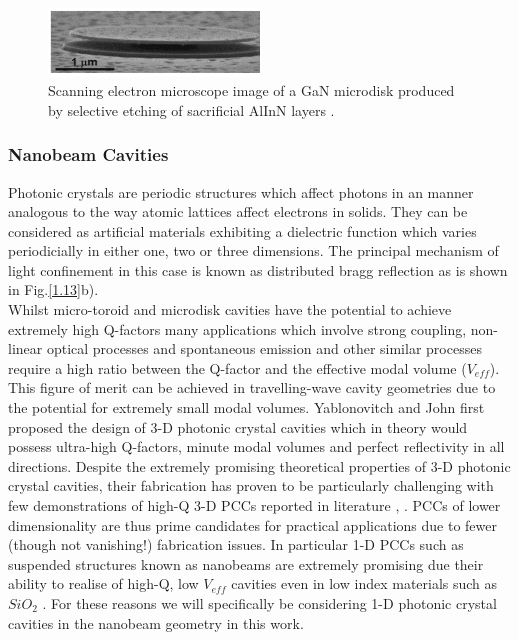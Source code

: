 \begin{figure}[h]
	\centering
	\includegraphics[width=0.5\textwidth]{Figs/Ch1/mdisksem.png}
	\caption {Scanning electron microscope image of a GaN microdisk produced by selective etching of sacrificial AlInN layers \cite{Simeonov2008}.}
	\label{1.15}
\end{figure}
\FloatBarrier 


\subsubsection{Nanobeam Cavities}
\label{nanobeam section}
Photonic crystals are periodic structures which affect photons in an manner analogous to the way atomic lattices affect electrons in solids. They can be considered as artificial materials exhibiting a dielectric function which varies periodicially in either one, two or three dimensions. The principal mechanism of light confinement in this case is known as distributed bragg reflection as is shown in Fig.\ref{1.13}b).\\
Whilst micro-toroid and microdisk cavities have the potential to achieve extremely high Q-factors many applications which involve strong coupling, non-linear optical processes and spontaneous emission and other similar processes require a high ratio between the Q-factor and the effective modal volume ($V_{eff}$). This figure of merit can be achieved in travelling-wave cavity geometries due to the potential for extremely small modal volumes. Yablonovitch \cite{Yablonovitch1987} and John \cite{John1987} first proposed the design of 3-D photonic crystal cavities which in theory would possess ultra-high Q-factors, minute modal volumes and perfect reflectivity in all directions. Despite the extremely promising theoretical properties of 3-D photonic crystal cavities, their fabrication has proven to be particularly challenging with few demonstrations of high-Q 3-D PCCs reported in literature \cite{Ishizaki2013}, \cite{Tandaechanurat2011}. PCCs of lower dimensionality are thus prime candidates for practical applications due to fewer (though not vanishing!) fabrication issues. In particular 1-D PCCs such as suspended structures known as nanobeams are extremely promising due their ability to realise of high-Q, low $V_{eff}$ cavities even in low index materials such as $SiO_{2}$ \cite{Gong2010}. For these reasons we will specifically be considering 1-D photonic crystal cavities in the nanobeam geometry in this work.\\
